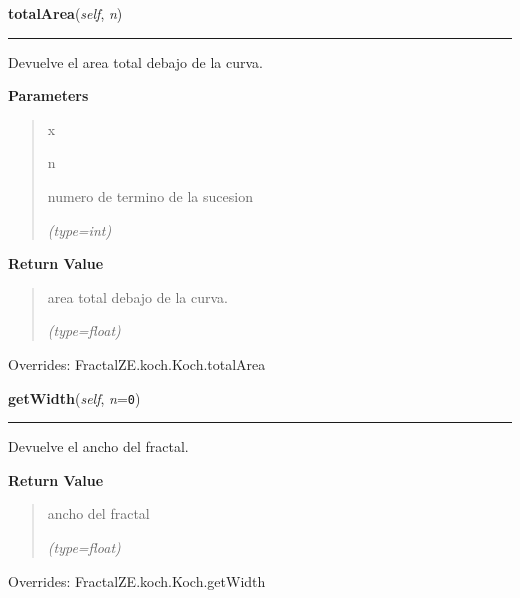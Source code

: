\hspace{.8\funcindent}\begin{boxedminipage}{\funcwidth}

    \raggedright \textbf{totalArea}(\textit{self}, \textit{n})

    \vspace{-1.5ex}

    \rule{\textwidth}{0.5\fboxrule}
\setlength{\parskip}{2ex}
    Devuelve el area total debajo de la curva.

\setlength{\parskip}{1ex}
      \textbf{Parameters}
      \vspace{-1ex}

      \begin{quote}
        \begin{Ventry}{x}

          \item[n]

          numero de termino de la sucesion

            {\it (type=int)}

        \end{Ventry}

      \end{quote}

      \textbf{Return Value}
    \vspace{-1ex}

      \begin{quote}
      area total debajo de la curva.

      {\it (type=float)}

      \end{quote}

      Overrides: FractalZE.koch.Koch.totalArea

    \end{boxedminipage}

    \vspace{0.5ex}

\hspace{.8\funcindent}\begin{boxedminipage}{\funcwidth}

    \raggedright \textbf{getWidth}(\textit{self}, \textit{n}={\tt 0})

    \vspace{-1.5ex}

    \rule{\textwidth}{0.5\fboxrule}
\setlength{\parskip}{2ex}
    Devuelve el ancho del fractal.

\setlength{\parskip}{1ex}
      \textbf{Return Value}
    \vspace{-1ex}

      \begin{quote}
      ancho del fractal

      {\it (type=float)}

      \end{quote}

      Overrides: FractalZE.koch.Koch.getWidth

    \end{boxedminipage}

